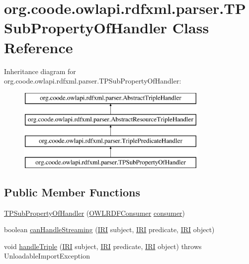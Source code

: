 \hypertarget{classorg_1_1coode_1_1owlapi_1_1rdfxml_1_1parser_1_1_t_p_sub_property_of_handler}{\section{org.\-coode.\-owlapi.\-rdfxml.\-parser.\-T\-P\-Sub\-Property\-Of\-Handler Class Reference}
\label{classorg_1_1coode_1_1owlapi_1_1rdfxml_1_1parser_1_1_t_p_sub_property_of_handler}
}
Inheritance diagram for org.\-coode.\-owlapi.\-rdfxml.\-parser.\-T\-P\-Sub\-Property\-Of\-Handler\-:\begin{figure}[H]
\begin{center}
\leavevmode
\includegraphics[height=4.000000cm]{classorg_1_1coode_1_1owlapi_1_1rdfxml_1_1parser_1_1_t_p_sub_property_of_handler}
\end{center}
\end{figure}
\subsection*{Public Member Functions}
\begin{DoxyCompactItemize}
\item 
\hyperlink{classorg_1_1coode_1_1owlapi_1_1rdfxml_1_1parser_1_1_t_p_sub_property_of_handler_aff5109d5377117856d2daef0853707c3}{T\-P\-Sub\-Property\-Of\-Handler} (\hyperlink{classorg_1_1coode_1_1owlapi_1_1rdfxml_1_1parser_1_1_o_w_l_r_d_f_consumer}{O\-W\-L\-R\-D\-F\-Consumer} \hyperlink{classorg_1_1coode_1_1owlapi_1_1rdfxml_1_1parser_1_1_abstract_triple_handler_a4ccf4d898ff01eb1cadfa04b23d54e9c}{consumer})
\item 
boolean \hyperlink{classorg_1_1coode_1_1owlapi_1_1rdfxml_1_1parser_1_1_t_p_sub_property_of_handler_afe166ed2bedf820f525ba57ab271b7bb}{can\-Handle\-Streaming} (\hyperlink{classorg_1_1semanticweb_1_1owlapi_1_1model_1_1_i_r_i}{I\-R\-I} subject, \hyperlink{classorg_1_1semanticweb_1_1owlapi_1_1model_1_1_i_r_i}{I\-R\-I} predicate, \hyperlink{classorg_1_1semanticweb_1_1owlapi_1_1model_1_1_i_r_i}{I\-R\-I} object)
\item 
void \hyperlink{classorg_1_1coode_1_1owlapi_1_1rdfxml_1_1parser_1_1_t_p_sub_property_of_handler_a289a74e1c3aa62db27af701ff327f7f4}{handle\-Triple} (\hyperlink{classorg_1_1semanticweb_1_1owlapi_1_1model_1_1_i_r_i}{I\-R\-I} subject, \hyperlink{classorg_1_1semanticweb_1_1owlapi_1_1model_1_1_i_r_i}{I\-R\-I} predicate, \hyperlink{classorg_1_1semanticweb_1_1owlapi_1_1model_1_1_i_r_i}{I\-R\-I} object)  throws Unloadable\-Import\-Exception 
\end{DoxyCompactItemize}
